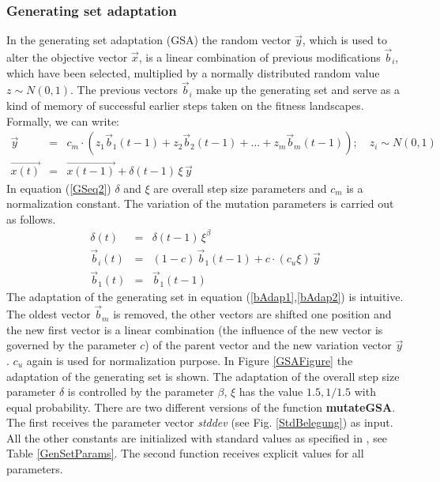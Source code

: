 \subsubsection{Generating set adaptation}
\label{ss:GenSet}
In the generating set adaptation (GSA) the random vector $\vec{y}$, which is
used to alter the objective vector $\vec{x}$, is a linear combination
of previous modifications $\vec{b}_i$, which have been selected,
multiplied by a normally distributed random value $z \sim
N(0,1)$. The previous vectors $\vec{b}_i$ make up the
generating set and serve as a kind of memory of successful earlier
steps taken on the fitness landscapes. Formally, we can write:
\begin{eqnarray}
\vec{y} & = & c_m \cdot \left( z_1 \vec{b}_1(t-1) + z_2 \vec{b}_2(t-1)
+ \ldots + z_m \vec{b}_m(t-1) \right);\quad z_i \sim N(0,1)\\
\label{GSeq2}
\vec{x(t)} & = & \vec{x(t-1)} + \delta(t-1)\, \xi \, \vec{y}
\end{eqnarray}
In equation (\ref{GSeq2}) $\delta$ and $\xi$ are overall step size 
parameters and $c_m$ is a normalization constant. The variation of the
mutation parameters is carried out as follows. 
\begin{eqnarray}
\delta(t)    & = & \delta(t-1) \, \xi^\beta \\
\label{bAdap1}
\vec{b}_i(t) & = & (1-c)\, \vec{b}_{1}(t-1) + c\cdot (c_u \xi) \, \vec{y}\\
\label{bAdap2}
\vec{b}_1(t) & = & \vec{b}_{1}(t-1)
\end{eqnarray}
The adaptation of the generating set in equation (\ref{bAdap1},\ref{bAdap2})
is intuitive. The oldest vector $\vec{b}_m$ is removed, the other
vectors are shifted one position and the new first vector is a linear
combination (the influence of the new vector is governed by the
parameter $c$) of the parent vector and the new variation vector
$\vec{y}$. $c_u$ again is used for normalization purpose. In Figure
\ref{GSAFigure} the adaptation of the generating set is shown.
The adaptation of the overall step size parameter $\delta$ is controlled by
the parameter $\beta$, $\xi$ has the value $1.5, 1/1.5$ with equal 
probability. There are two different versions of the function 
{\sffamily\bfseries\small mutateGSA}. The first receives the 
parameter vector \emph{stddev} (see Fig. \ref{StdBelegung})
as input. All the other constants are 
initialized with standard values as 
specified in \cite{Hansen:95}, see Table \ref{GenSetParams}. 
The second function receives explicit values for all parameters.
